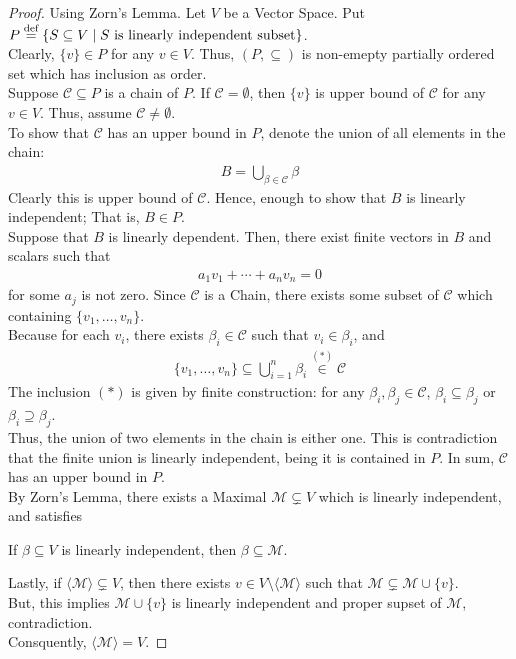 \begin{proof}
    Using Zorn's Lemma. Let $V$ be a Vector Space.
    Put $P \overset{\textnormal{def}}{=} \{S \subseteq V \mid \text{$S$ is linearly independent subset}\}$. \\
    Clearly, $\{v\} \in P$ for any $v \in V$. Thus, $(P, \subseteq)$ is non-emepty partially ordered set which has inclusion as order. \\
    Suppose $\mathcal{C} \subseteq P$ is a chain of $P$. If $\mathcal{C} = \emptyset$,
    then $\{v\}$ is upper bound of $\mathcal{C}$ for any $v \in V$. Thus, assume $\mathcal{C} \neq \emptyset$. \\
    To show that $\mathcal{C}$ has an upper bound in $P$, denote the union of all elements in the chain:
    \begin{align*}
        B = \bigcup_{\beta \in \mathcal{C}} \beta
    \end{align*}
    Clearly this is upper bound of $\mathcal{C}$. Hence, enough to show that $B$ is linearly independent; That is, $B \in P$. \\
    Suppose that $B$ is linearly dependent. Then, there exist finite vectors in $B$ and scalars such that
    \begin{align*}
        a_1 v_1 + \cdots + a_n v_n = 0
    \end{align*}
    for some $a_j$ is not zero.
    Since $\mathcal{C}$ is a Chain, there exists some subset of $\mathcal{C}$ which containing $\{v_1, \ldots, v_n \}$. \\
    Because for each $v_i$, there exists $\beta_i \in \mathcal{C}$ such that $v_i \in \beta_i$, and
    \begin{align*}
        \{v_1, \ldots, v_n \} \subseteq \bigcup_{i=1}^n \beta_i \overset{(*)}{\in} \mathcal{C}
    \end{align*}
    The inclusion $(*)$ is given by finite construction: for any $\beta_i, \beta_j \in \mathcal{C}$,
    $\beta_i \subseteq \beta_j$ or $\beta_i \supseteq \beta_j$. \\
    Thus, the union of two elements in the chain is either one. 
    This is contradiction that the finite union is linearly independent, being it is contained in $P$.
    In sum, $\mathcal{C}$ has an upper bound in $P$. \\
    By Zorn's Lemma,
    there exists a Maximal $\mathcal{M} \subsetneq V$ which is linearly independent, and satisfies
    \begin{center}
        If $\beta \subseteq V$ is linearly independent, then $\beta \subseteq \mathcal{M}$.
    \end{center}
    Lastly, if $\langle \mathcal{M} \rangle \subsetneq V$, then there exists $v \in V \setminus \langle \mathcal{M} \rangle$ such that
    $\mathcal{M} \subsetneq \mathcal{M} \cup \{v\}$. \\
    But, this implies $\mathcal{M} \cup \{v\}$ is linearly independent and
    proper supset of $\mathcal{M}$, contradiction.  \\
    Consquently, $\langle \mathcal{M} \rangle = V$.
\end{proof}

